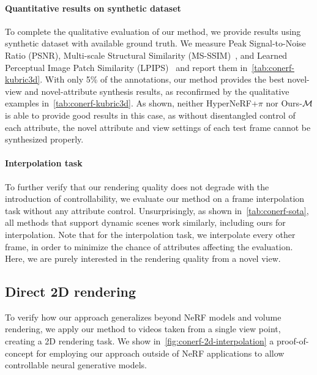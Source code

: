     \paragraph{Quantitative results on synthetic dataset}
      To complete the qualitative evaluation of our method, we provide results
      using synthetic dataset with available ground truth.
      We measure Peak Signal-to-Noise Ratio (PSNR), Multi-scale Structural
      Similarity (MS-SSIM)~\cite{wang2003multiscale}, and Learned Perceptual
      Image Patch Similarity (LPIPS)~\cite{zhang2018unreasonable} and report
      them in~\cref{tab:conerf-kubric3d}.
      With only 5\% of the annotations, our method provides the best
      novel-view and novel-attribute synthesis results, as reconfirmed by the
      qualitative examples in~\cref{tab:conerf-kubric3d}.
      As shown, neither HyperNeRF{+}$\pi$ nor Ours{-}$\mathcal{M}$ is able to
      provide good results in this case, as without disentangled control of
      each attribute, the novel attribute and view settings of each test frame
      cannot be synthesized properly.

    \paragraph{Interpolation task}
      To further verify that our rendering quality does not degrade with the
      introduction of controllability, we evaluate our method on a frame
      interpolation task without any attribute control.
      Unsurprisingly, as shown in~\cref{tab:conerf-sota}, all methods that
      support dynamic scenes work similarly, including ours for interpolation.
      Note that for the interpolation task, we interpolate every other frame,
      in order to minimize the chance of attributes affecting the evaluation.
      Here, we are purely interested in the rendering quality from a novel
      view.

      

      
  \subsection{Direct 2D rendering}
    To verify how our approach generalizes beyond NeRF models and volume
    rendering, we apply our method to videos taken from a single view point,
    creating a 2D rendering task.
    We show in~\cref{fig:conerf-2d-interpolation} a proof-of-concept for
    employing our approach outside of NeRF applications to allow controllable
    neural generative models.


